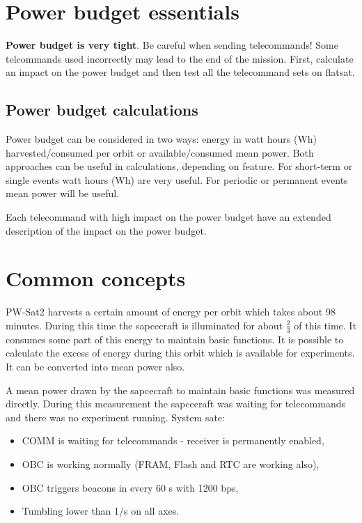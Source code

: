 \section{Power budget essentials}

\textbf{Power budget is very tight}. Be careful when sending telecommands! Some telcommands used incorrectly may lead to the end of the mission. First, calculate an impact on the power budget and then test all the telecommand sets on flatsat.

\subsection{Power budget calculations}
Power budget can be considered in two ways: energy in watt hours (Wh) harvested/consumed per orbit or available/consumed mean power. Both approaches can be useful in calculations, depending on feature. For short-term or single events watt hours (Wh) are very useful. For periodic or permanent events mean power will be useful.

Each telecommand with high impact on the power budget have an extended description of the impact on the power budget.

\section{Common concepts}
PW-Sat2 harvests a certain amount of energy per orbit which takes about 98 minutes. During this time the sapcecraft is illuminated for about $\frac{2}{3}$ of this time. It consumes some part of this energy to maintain basic functions. It is possible to calculate the excess of energy during this orbit which is available for experiments. It can be converted into mean power also.

A mean power drawn by the sapcecraft to maintain basic functions was measured directly. During this measurement the sapcecraft was waiting for telecommands and there was no experiment running. System sate:
\begin{itemize}
	\item COMM is waiting for telecommands - receiver is permanently enabled,
	\item OBC is working normally (FRAM, Flash and RTC are working also),
	\item OBC triggers beacons in every 60 s with 1200 bps,
	\item Tumbling lower than 1\textdegree/s on all axes.
\end{itemize}

